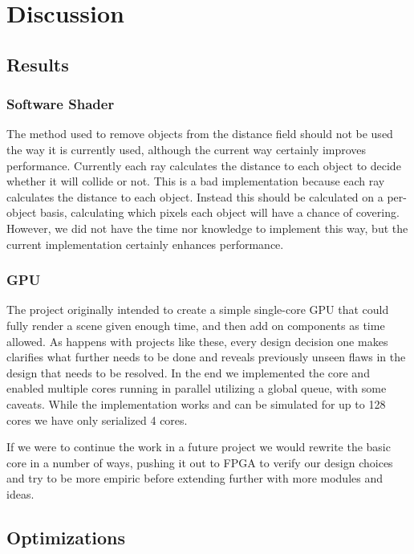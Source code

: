 \chapter{Discussion}
	
	\section{Results}
		
		\subsection{Software Shader}
		
			The method used to remove objects from the distance field should
			not be used the way it is currently used, although the current way
			certainly improves performance. Currently each ray calculates the
			distance to each object to decide whether it will collide or not. 
			This is a bad implementation because each ray calculates the 
			distance to each object. Instead this should be calculated on a 
			per-object basis, calculating which pixels each object will have
			a chance of covering. However, we did not have the time nor
			knowledge to implement this way, but the current implementation
			certainly enhances performance.
		
		\subsection{GPU} 
		
			The project originally intended to create a simple single-core GPU
			that could fully render a scene given enough time, and then add on
			components as time allowed. As happens with projects like these,
			every design decision one makes clarifies what further needs to be
			done and reveals previously unseen flaws in the design that needs
			to be resolved. In the end we implemented the core and enabled
			multiple cores running in parallel utilizing a global queue, with
			some caveats. While the implementation works and can be simulated
			for up to 128 cores we have only serialized 4 cores. 
			
			If we were to continue the work in a future project we would
			rewrite the basic core in a number of ways, pushing it out to FPGA
			to verify our design choices and try to be more empiric before
			extending further with more modules and ideas. 

	\section{Optimizations}


